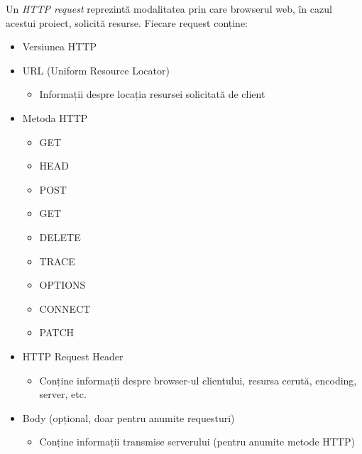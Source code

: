 Un {\it HTTP request} reprezintă modalitatea prin care browserul web, în cazul acestui proiect, solicită resurse. Fiecare request conține:
\begin{itemize}
	\setlength\itemsep{0.5em}
    \item Versiunea HTTP
    \item URL (Uniform Resource Locator)
    \begin{itemize}
		\setlength\itemsep{0.5em}
        \item Informații despre locația resursei solicitată de client
    \end{itemize}
    \item Metoda HTTP
    \begin{itemize}
		\setlength\itemsep{0.5em}
        \begingroup \color{blue}
        \item GET \endgroup
        \item HEAD
        \begingroup \color{blue}
        \item POST \endgroup
        \begingroup \color{blue}
        \item GET \endgroup
        \begingroup \color{blue}
        \item DELETE \endgroup
        \item TRACE
        \item OPTIONS
        \item CONNECT
        \item PATCH
    \end{itemize}
    \item HTTP Request Header
    \begin{itemize}
		\setlength\itemsep{0.5em}
        \item Conține informații despre browser-ul clientului, resursa cerută, encoding, server, etc.
    \end{itemize}
    \item Body (opțional, doar pentru anumite requesturi)
    \begin{itemize}
		\setlength\itemsep{0.5em}
        \item Conține informații transmise serverului (pentru anumite metode HTTP)
    \end{itemize}
\end{itemize}
\ \\

